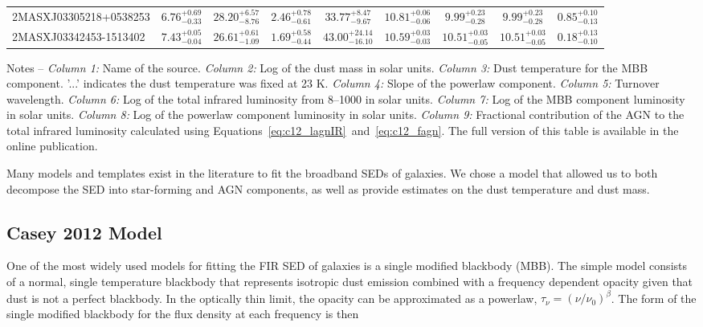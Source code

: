\documentclass[fleqn, usenatbib]{mnras}
\begin{document}
\begin{table}
\begin{threeparttable}
\begin{tabular}{lcccccccc}
2MASXJ03305218+0538253 & $6.76_{-0.33}^{+0.69}$ & $28.20_{-8.76}^{+6.57}$ & $2.46_{-0.61}^{+0.78}$ &$33.77_{-9.67}^{+8.47}$ & $10.81_{-0.06}^{+0.06}$ & $9.99_{-0.28}^{+0.23}$ & $9.99_{-0.28}^{+0.23}$ & $0.85_{-0.13}^{+0.10}$ \\
2MASXJ03342453-1513402 & $7.43_{-0.04}^{+0.05}$ & $26.61_{-1.09}^{+0.61}$ & $1.69_{-0.44}^{+0.58}$ &$43.00_{-16.10}^{+24.14}$ & $10.59_{-0.03}^{+0.03}$ & $10.51_{-0.05}^{+0.03}$ & $10.51_{-0.05}^{+0.03}$ & $0.18_{-0.10}^{+0.13}$ \\\bottomrule
\end{tabular}
\begin{tablenotes}
\item Notes -- \textit{Column 1:} Name of the source. \textit{Column 2:} Log of the dust mass in solar units. \textit{Column 3:} Dust temperature for the MBB component. '...' indicates the dust temperature was fixed at 23 K. \textit{Column 4:} Slope of the powerlaw component. \textit{Column 5:} Turnover wavelength. \textit{Column 6:} Log of the total infrared luminosity from 8--1000 \micron{} in solar units. \textit{Column 7:} Log of the MBB component luminosity in solar units. \textit{Column 8:} Log of the powerlaw component luminosity in solar units. \textit{Column 9:} Fractional contribution of the AGN to the total infrared luminosity calculated using Equations~\ref{eq:c12_lagnIR}~and~\ref{eq:c12_fagn}. The full version of this table is available in the online publication.
\end{tablenotes}
\end{threeparttable}
\end{table}

Many models and templates exist in the literature to fit the broadband SEDs of galaxies. We chose a model that allowed us to both decompose the SED into star-forming and AGN components, as well as provide estimates on the dust temperature and dust mass.

\subsection{Casey 2012 Model}
One of the most widely used models for fitting the FIR SED of galaxies is a single modified blackbody (MBB). The simple model consists of a normal, single temperature blackbody that represents isotropic dust emission combined with a frequency dependent opacity given that dust is not a perfect blackbody. In the optically thin limit, the opacity can be approximated as a powerlaw, $\tau_{\nu}=(\nu/\nu_{0})^{\beta}$. The form of the single modified blackbody for the flux density at each frequency is then
\end{document}
